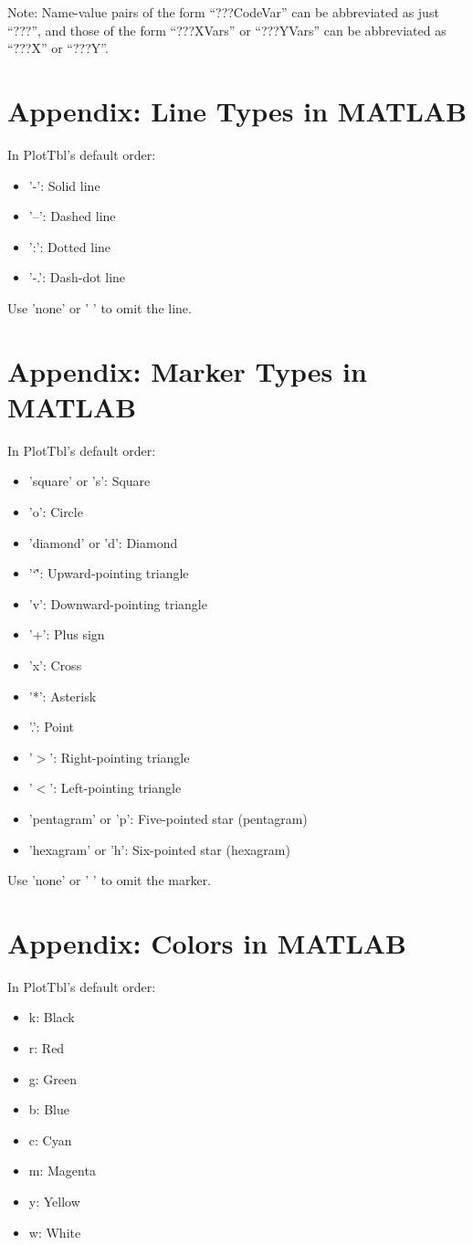 \documentclass{article}
\newcommand{\caret}{\char`\^}
\begin{document}
Note: Name-value pairs of the form ``???CodeVar'' can be abbreviated as just ``???'',
and those of the form ``???XVars'' or ``???YVars'' can be abbreviated as ``???X'' or ``???Y''.

\section{Appendix: Line Types in MATLAB}

In PlotTbl's default order:

\begin{itemize}
\item '-': Solid line
\item '--': Dashed line
\item ':': Dotted line
\item '-.': Dash-dot line
\end{itemize}

Use 'none' or ' ' to omit the line.

\section{Appendix: Marker Types in MATLAB}

In PlotTbl's default order:

\begin{itemize}
\item 'square' or 's': Square
\item 'o': Circle
\item 'diamond' or 'd': Diamond
\item '\caret': Upward-pointing triangle
\item 'v': Downward-pointing triangle
\item '+': Plus sign
\item 'x': Cross
\item '*': Asterisk
\item '.': Point
\item '$>$': Right-pointing triangle
\item '$<$': Left-pointing triangle
\item 'pentagram' or 'p': Five-pointed star (pentagram)
\item 'hexagram' or 'h': Six-pointed star (hexagram)
\end{itemize}

Use 'none' or ' ' to omit the marker.

\section{Appendix: Colors in MATLAB}

In PlotTbl's default order:

\begin{itemize}
\item k: Black
\item r: Red
\item g: Green
\item b: Blue
\item c: Cyan
\item m: Magenta
\item y: Yellow
\item w: White
\end{itemize}
\end{document}
